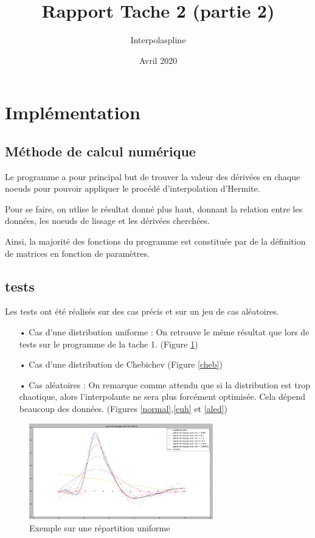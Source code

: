 \documentclass[a4paper,12pt]{article} %
\title{Rapport Tache 2 (partie 2)}
\author{Interpolaspline}
\date{Avril 2020}
\begin{document}
\maketitle

\section{Implémentation}

\subsection{Méthode de calcul numérique}

Le programme a pour principal but de trouver la valeur des dérivées en chaque noeuds pour pouvoir appliquer le procédé d'interpolation d'Hermite.

Pour se faire, on utlise le résultat donné plus haut, donnant la relation entre les données, les noeuds de lissage et les dérivées cherchées.

Ainsi, la majorité des fonctions du programme est constituée par de la définition de matrices en fonction de paramètres.

\subsection{tests}

Les tests ont été réalisés sur des cas précis et sur un jeu de cas aléatoires.

\begin{itemize}
\item[•] Cas d'une distribution uniforme : On retrouve le même résultat que lors de tests sur le programme de la tache 1. (Figure \ref{unif})
\item[•] Cas d'une distribution de Chebichev (Figure \ref{cheb})
\item[•] Cas aléatoires : On remarque comme attendu que si la distribution est trop chaotique, alors l'interpolante ne sera plus forcément optimisée. Cela dépend beaucoup des données. (Figures \ref{normal},\ref{euh} et \ref{aled})
\end{itemize}

\begin{figure}
\begin{center}
\includegraphics[width=8cm]{unif.png} 
\end{center}
\caption{Exemple sur une répartition uniforme}
\label{unif}
\end{figure}
\end{document}
